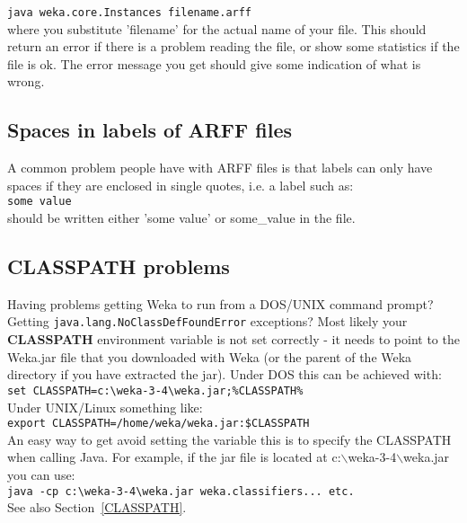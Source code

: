 \verb=java weka.core.Instances filename.arff=\\

\noindent where you substitute 'filename' for the actual name of your
file. This should return an error if there is a problem reading the
file, or show some statistics if the file is ok. The error message you
get should give some indication of what is wrong.

\subsection{Spaces in labels of ARFF files}
A common problem people have with ARFF files is that labels can only
have spaces if they are enclosed in single quotes, i.e. a label such
as:\\

\verb=some value=\\

\noindent should be written either 'some value' or some\_value in the file.

\subsection{CLASSPATH problems}
Having problems getting Weka to run from a DOS/UNIX command prompt?
Getting \verb=java.lang.NoClassDefFoundError= exceptions? Most likely your
\textbf{CLASSPATH} environment variable is not set correctly - it needs to
point to the Weka.jar file that you downloaded with Weka (or the
parent of the Weka directory if you have extracted the jar). Under DOS
this can be achieved with:\\

\verb^set CLASSPATH=c:\weka-3-4\weka.jar;%CLASSPATH%^\\

\noindent Under UNIX/Linux something like:\\

\verb^export CLASSPATH=/home/weka/weka.jar:$CLASSPATH^\\

\noindent An easy way to get avoid setting the variable this is to
specify the CLASSPATH when calling Java. For example, if the jar file
is located at c:$\backslash$weka-3-4$\backslash$weka.jar you can use:\\

\verb^java -cp c:\weka-3-4\weka.jar weka.classifiers... etc.^\\

\noindent See also Section~\ref{CLASSPATH}.

